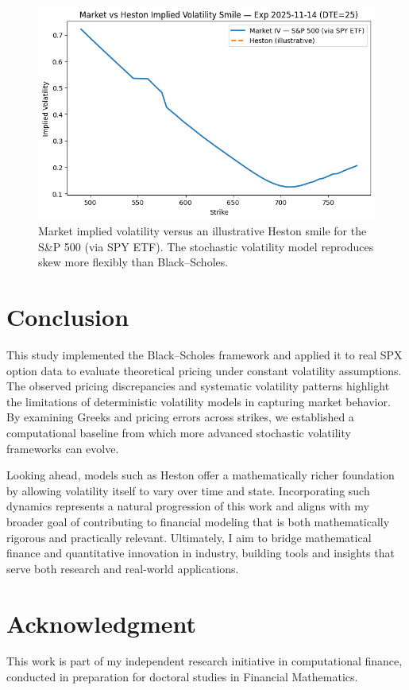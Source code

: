 \documentclass[12pt]{article}
\begin{document}
\begin{figure}[H]
\centering
\includegraphics[width=0.85\linewidth]{heston_smile.png}
\caption{Market implied volatility versus an illustrative Heston smile for the S\&P 500 (via SPY ETF). The stochastic volatility model reproduces skew more flexibly than Black--Scholes.}
\label{fig:heston-smile}
\end{figure}






\section{Conclusion}
This study implemented the Black--Scholes framework and applied it to real SPX option data to evaluate theoretical pricing under constant volatility assumptions. The observed pricing discrepancies and systematic volatility patterns highlight the limitations of deterministic volatility models in capturing market behavior. By examining Greeks and pricing errors across strikes, we established a computational baseline from which more advanced stochastic volatility frameworks can evolve.

Looking ahead, models such as Heston offer a mathematically richer foundation by allowing volatility itself to vary over time and state. Incorporating such dynamics represents a natural progression of this work and aligns with my broader goal of contributing to financial modeling that is both mathematically rigorous and practically relevant. Ultimately, I aim to bridge mathematical finance and quantitative innovation in industry, building tools and insights that serve both research and real-world applications.


\section*{Acknowledgment}
This work is part of my independent research initiative in computational finance, conducted in preparation for doctoral studies in Financial Mathematics.





\end{document}
